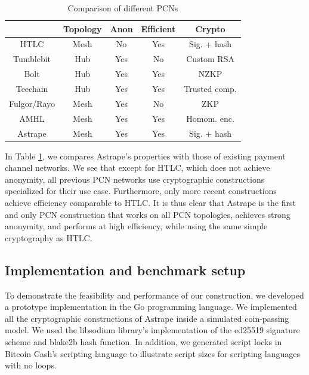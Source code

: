 \documentclass[USenglish,oneside,twocolumn]{article}
\begin{document}
\begin{table}[h!]
    \caption{Comparison of different PCNs}
    \label{tab:pcncomparison}
    \centering
    \footnotesize
    \begin{tabular}{ccccc}
        \toprule
                    & Topology & Anon & Efficient & Crypto        \\
        \midrule
        HTLC        & Mesh     & No   & Yes       & Sig. + hash   \\
        \midrule
        Tumblebit   & Hub      & Yes  & No        & Custom RSA    \\
        Bolt        & Hub      & Yes  & Yes       & NZKP          \\
        Teechain    & Hub      & Yes  & Yes       & Trusted comp. \\
        \midrule
        Fulgor/Rayo & Mesh     & Yes  & No        & ZKP           \\
        AMHL        & Mesh     & Yes  & Yes       & Homom. enc.   \\
        \midrule
        Astrape     & Mesh     & Yes  & Yes       & Sig. + hash   \\
        \bottomrule
    \end{tabular}
\end{table}

In Table \ref{tab:pcncomparison}, we compares Astrape's properties with those of existing payment channel networks. We see that except for HTLC, which does not achieve anonymity, all previous PCN networks use cryptographic constructions specialized for their use case. Furthermore, only more recent constructions achieve efficiency comparable to HTLC. It is thus clear that Astrape is the first and only PCN construction that works on all PCN topologies, achieves strong anonymity, and performs at high efficiency, while using the same simple cryptography as HTLC.

\subsection{Implementation and benchmark setup}

To demonstrate the feasibility and performance of our construction, we developed a prototype implementation in the Go programming language. We implemented all the cryptographic constructions of Astrape inside a simulated coin-passing model. We used the libsodium library's implementation of the ed25519 \cite{moeller2015ietf} signature scheme and blake2b \cite{aumasson2013blake2} hash function. In addition, we generated script locks in Bitcoin Cash's scripting language to illustrate script sizes for scripting languages with no loops.
\end{document}

